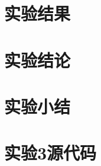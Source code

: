 ﻿\documentclass[UTF8,12pt]{article}
\begin{document}
\section{实验结果}

\section{实验结论}


\section{实验小结}


\newpage

\section{实验3源代码}
\end{document}
